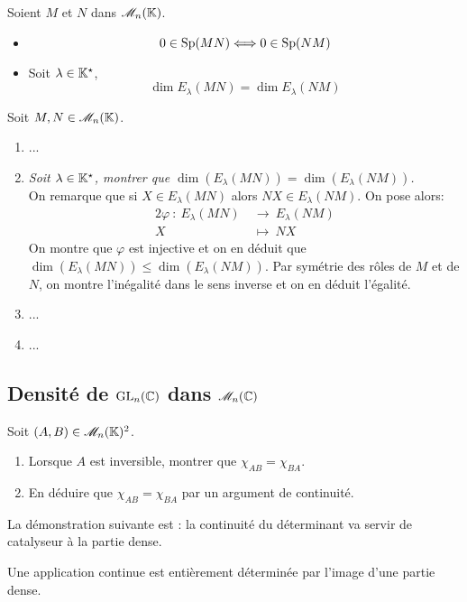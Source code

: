 \begin{prop}
    Soient $M$ et $N$ dans $\mathscr{M}_n(\mathbb{K})$.
    \begin{itemize}
        \item $$0 \in \mathrm{Sp}(MN) \Longleftrightarrow 0 \in \mathrm{Sp}(NM)$$
        \item Soit $\lambda \in \mathbb{K}^\star$,
        $$\dim E_\lambda(MN) = \dim E_\lambda(NM)$$
    \end{itemize}
\end{prop}

Soit $M, N \in \mathscr{M}_n(\mathbb{K})$. 
\begin{enumerate}
    \item ...
    \item \emph{Soit $\lambda \in \mathbb{K}^\star$, montrer que $\dim(E_\lambda (MN)) = \dim(E_\lambda (NM))$.} \\
    On remarque que si $X \in E_\lambda (MN)$ alors $NX \in E_\lambda (NM)$. On pose alors:
    \begin{alignat*}{2}
        \varphi\ :\ E_\lambda (MN)\ &\longrightarrow\ E_\lambda (NM)\\
        X\ &\longmapsto\ NX
    \end{alignat*}
    On montre que $\varphi$ est injective et on en déduit que $\dim(E_\lambda (MN)) \leqslant \dim(E_\lambda (NM))$. Par symétrie des rôles de $M$ et de $N$, on montre l'inégalité dans le sens inverse et on en déduit l'égalité.
    \item ...
    \item ...
\end{enumerate}

\subsection{Densité de \texorpdfstring{$\mathrm{GL}_n(\mathbb{C})$}{GL_n(C)} dans \texorpdfstring{$\mathscr{M}_n(\mathbb{C})$}{M_n(C)}}

\begin{exercice}
    Soit $(A, B) \in \mathscr{M}_n(\mathbb{K})^2$.
    \begin{enumerate}
        \item Lorsque $A$ est inversible, montrer que $\chi_{AB}=\chi_{BA}$.
        \item En déduire que $\chi_{AB}=\chi_{BA}$ par un argument de continuité.
    \end{enumerate}
\end{exercice}

La démonstration suivante est : la continuité du déterminant va servir de catalyseur à la partie dense.
\begin{center}
    Une application continue est entièrement déterminée par l'image d'une partie dense.
\end{center}

